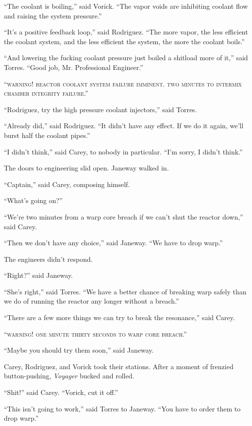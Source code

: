 \documentclass[twoside,letterpaper,12pt]{memoir}
\begin{document}
``The coolant is boiling,'' said Vorick. ``The vapor voids are inhibiting coolant flow and raising the system pressure.''

``It's a positive feedback loop,'' said Rodriguez. ``The more vapor, the less efficient the coolant system, and the less efficient the system, the more the coolant boils.''

``And lowering the fucking coolant pressure just boiled a shitload more of it,'' said Torres. ``Good job, Mr. Professional Engineer.''

``\textsc{warning! reactor coolant system failure imminent. two minutes to intermix chamber integrity failure}.''

``Rodriguez, try the high pressure coolant injectors,'' said Torres.

``Already did,'' said Rodriguez. ``It didn't have any effect. If we do it again, we'll burst half the coolant pipes.''

``I didn't think,'' said Carey, to nobody in particular. ``I'm sorry, I didn't think.''

The doors to engineering slid open. Janeway walked in.

``Captain,'' said Carey, composing himself.

``What's going on?''

``We're two minutes from a warp core breach if we can't shut the reactor down,'' said Carey.

``Then we don't have any choice,'' said Janeway. ``We have to drop warp.''

The engineers didn't respond.

``Right?'' said Janeway.

``She's right,'' said Torres. ``We have a better chance of breaking warp safely than we do of running the reactor any longer without a breach.''

``There are a few more things we can try to break the resonance,'' said Carey.

``\textsc{warning! one minute thirty seconds to warp core breach}.''

``Maybe you should try them soon,'' said Janeway.

Carey, Rodriguez, and Vorick took their stations. After a moment of frenzied button-pushing, \textit{Voyager} bucked and rolled.

``Shit!'' said Carey. ``Vorick, cut it off.''

``This isn't going to work,'' said Torres to Janeway. ``You have to order them to drop warp.''
\end{document}
